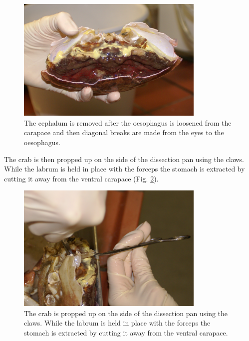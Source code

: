 \begin{figure}[H]
	\begin{center}
		\includegraphics[width=9cm]{graphics/dissection_crab10.png}
		\caption{The cephalum is removed after the oesophagus is loosened from the carapace and then diagonal breaks are made from the eyes to the oesophagus.}
		\label{fig:dissection_crab10}
	\end{center}
\end{figure}

The crab is then propped up on the side of the dissection pan using the claws. While the labrum is held in place with the forceps the stomach is extracted by cutting it away from the ventral carapace (Fig. \ref{fig:dissection_crab11}).

\begin{figure}[H]
	\begin{center}
		\includegraphics[width=9cm]{graphics/dissection_crab11.png}
		\caption{The crab is propped up on the side of the dissection pan using the claws. While the labrum is held in place with the forceps the stomach is extracted by cutting it away from the ventral carapace.}
		\label{fig:dissection_crab11}
	\end{center}
\end{figure}

